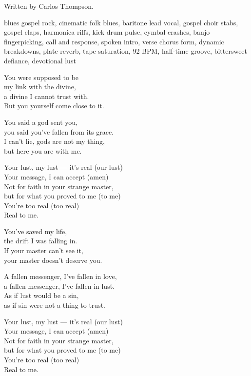 
\label{sec:fallen-messenger}
\begin{notes}
Written by Carlos Thompson.
\end{notes}
\begin{style}
blues gospel rock, cinematic folk blues, baritone lead vocal, gospel choir stabs, gospel claps, harmonica riffs, kick drum pulse, cymbal crashes, banjo fingerpicking, call and response, spoken intro, verse chorus form, dynamic breakdowns, plate reverb, tape saturation, 92 BPM, half-time groove, bittersweet defiance, devotional lust
\end{style}
\begin{lyrics}

You were supposed to be\\
my link with the divine,\\
a divine I cannot trust with.\\
But you yourself come close to it.

You said a god sent you,\\
you said you’ve fallen from its grace.\\
I can’t lie, gods are not my thing,\\
but here you are with me.

Your lust, my lust — it’s real (our lust)\\
Your message, I can accept (amen)\\
Not for faith in your strange master,\\
but for what you proved to me (to me)\\
You’re too real (too real)\\
Real to me.

You’ve saved my life,\\
the drift I was falling in.\\
If your master can’t see it,\\
your master doesn’t deserve you.

A fallen messenger, I’ve fallen in love,\\
a fallen messenger, I’ve fallen in lust.\\
As if lust would be a sin,\\
as if sin were not a thing to trust.

Your lust, my lust — it’s real (our lust)\\
Your message, I can accept (amen)\\
Not for faith in your strange master,\\
but for what you proved to me (to me)\\
You’re too real (too real)\\
Real to me.


\end{lyrics}
